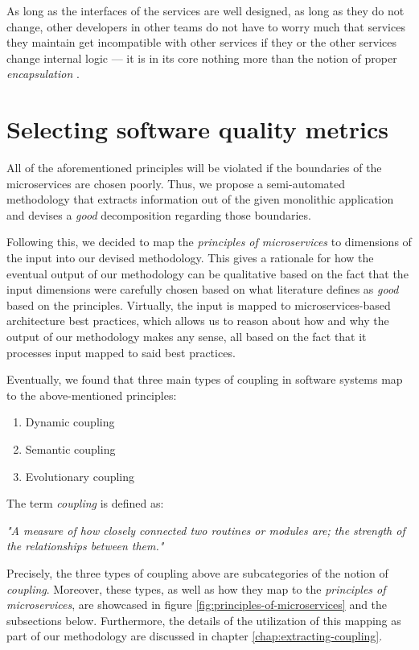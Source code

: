 \documentclass[12pt,a4paper]{report}
\begin{document}
As long as the interfaces of the services are well designed, as long as they do
not change, other developers in other teams do not have to worry much that
services they maintain get incompatible with other services if they or the
other services change internal logic --- it is in its core nothing more than
the notion of proper \textit{encapsulation} \cite{ms-fowler}.



\section{Selecting software quality metrics} \label{sect:software-quality-metrics}

All of the aforementioned principles will be violated if the boundaries of the
microservices are chosen poorly. Thus, we propose a semi-automated methodology
that extracts information out of the given monolithic application and devises a
\textit{good} decomposition regarding those boundaries.

Following this, we decided to map the \textit{principles of microservices} to
dimensions of the input into our devised methodology. This gives a rationale
for how the eventual output of our methodology can be qualitative based on the
fact that the input dimensions were carefully chosen based on what literature
defines as \textit{good} based on the principles. Virtually, the input is
mapped to microservices-based architecture best practices, which allows us to
reason about how and why the output of our methodology makes any sense, all
based on the fact that it processes input mapped to said best practices.

Eventually, we found that three main types of coupling in software systems map
to the above-mentioned principles:
\begin{enumerate}
  \item Dynamic coupling
  \item Semantic coupling
  \item Evolutionary coupling
\end{enumerate} The term \textit{coupling} is defined as:
\begin{displayquote}
  \emph{
  "A measure of how closely connected two routines or modules are;
  the strength of the relationships between them."
  }~\cite{swebok}
\end{displayquote}
Precisely, the three types of coupling above are subcategories of the notion of
\textit{coupling}. Moreover, these types, as well as how they map to the
\textit{principles of microservices}, are showcased in figure
\ref{fig:principles-of-microservices} and the subsections below.
Furthermore, the details of the utilization of this mapping as part of
our methodology are discussed in chapter \ref{chap:extracting-coupling}.
\end{document}
